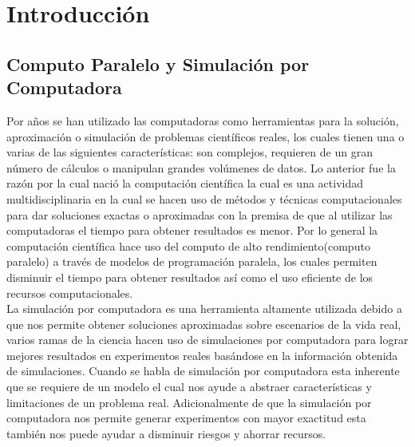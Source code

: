 \chapter{Introducción}
\label{champ:intro}
\bigskip
\barra
\bigskip

\section{Computo Paralelo y Simulación por Computadora}
\label{sec:cp}

Por años se han utilizado las computadoras como herramientas para la solución, aproximación o simulación de problemas científicos reales, los cuales tienen una o varias de las siguientes características: son complejos, requieren de un gran número de cálculos o manipulan grandes volúmenes de datos. Lo anterior fue la razón por la cual nació la computación científica la cual es una actividad multidisciplinaria en la cual se hacen uso de métodos y técnicas computacionales para dar soluciones exactas o aproximadas con la premisa de que al utilizar las computadoras el tiempo para obtener resultados es menor. Por lo general la computación científica hace uso  del computo de alto rendimiento(computo paralelo) a través de modelos de programación paralela, los cuales permiten disminuir el tiempo para obtener resultados así como el uso eficiente de los recursos computacionales.\\

La simulación por computadora es una herramienta altamente utilizada debido a que nos permite obtener soluciones aproximadas sobre escenarios de la vida real, varios ramas de la ciencia hacen uso de simulaciones por computadora para lograr mejores resultados en experimentos reales basándose en la información obtenida de simulaciones. Cuando se habla de simulación por computadora esta inherente que se requiere de un modelo el cual nos ayude a abstraer características y limitaciones de un problema real. Adicionalmente de que la simulación por computadora nos permite generar experimentos con mayor exactitud esta también nos puede ayudar a disminuir riesgos y ahorrar recursos.\\

